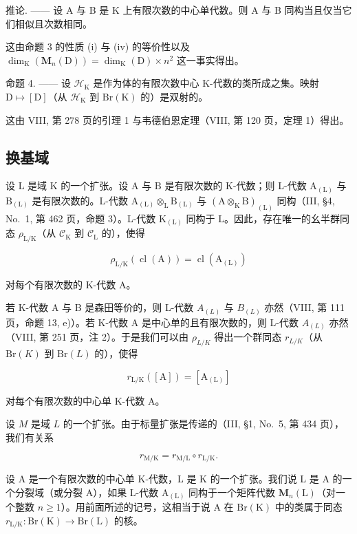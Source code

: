 推论. —— 设 A 与 B 是 K 上有限次数的中心单代数。则 A 与 B 同构当且仅当它们相似且次数相同。

这由命题 3 的性质 (i) 与 (iv) 的等价性以及 \(\dim_{\mathrm{K}}(\mathbf{M}_n(\mathrm{D})) = \dim_{\mathrm{K}}(\mathrm{D}) \times n^2\) 这一事实得出。

命题 4. —— 设 \(\mathcal{H}_{\mathrm{K}}\) 是作为体的有限次数中心 K-代数的类所成之集。映射 \(\mathrm{D} \mapsto [\mathrm{D}]\)（从 \(\mathcal{H}_{\mathrm{K}}\) 到 \(\mathrm{Br}(\mathrm{K})\) 的）是双射的。

这由 VIII, 第 278 页的引理 1 与韦德伯恩定理（VIII, 第 120 页，定理 1）得出。

\subsection{换基域}

设 \(\mathrm{L}\) 是域 \(\mathrm{K}\) 的一个扩张。设 \(\mathrm{A}\) 与 \(\mathrm{B}\) 是有限次数的 K-代数；则 L-代数 \(\mathrm{A}_{(\mathrm{L})}\) 与 \(\mathrm{B}_{(\mathrm{L})}\) 是有限次数的。L-代数 \(\mathrm{A}_{(\mathrm{L})} \otimes_{\mathrm{L}} \mathrm{B}_{(\mathrm{L})}\) 与 \((\mathrm{A} \otimes_{\mathrm{K}} \mathrm{B})_{(\mathrm{L})}\) 同构（III, §4, No.~1, 第 462 页，命题 3）。L-代数 \(\mathrm{K}_{(\mathrm{L})}\) 同构于 \(\mathrm{L}\)。因此，存在唯一的幺半群同态 \(\rho_{\mathrm{L/K}}\)（从 \(\mathcal{C}_{\mathrm{K}}\) 到 \(\mathcal{C}_{\mathrm{L}}\) 的），使得

\[
\rho_ {\mathrm{L/K}} (\operatorname{cl} (\mathrm{A})) = \operatorname{cl} (\mathrm{A} _ {(\mathrm{L})})\tag{3}
\]

对每个有限次数的 K-代数 A。

若 K-代数 A 与 B 是森田等价的，则 L-代数 \(A_{(L)}\) 与 \(B_{(L)}\) 亦然（VIII, 第 111 页，命题 13, e)）。若 K-代数 A 是中心单的且有限次数的，则 L-代数 \(A_{(L)}\) 亦然（VIII, 第 251 页，注 2）。于是我们可以由 \(\rho_{L/K}\) 得出一个群同态 \(r_{L/K}\)（从 \(\mathrm{Br}(K)\) 到 \(\mathrm{Br}(L)\) 的），使得

\[
r _ {\mathrm{L/K}} ([ \mathrm{A} ]) = [ \mathrm{A} _ {(\mathrm{L})} ]\tag{4}
\]

对每个有限次数的中心单 K-代数 A。

设 \(M\) 是域 \(L\) 的一个扩张。由于标量扩张是传递的（III, §1, No.~5, 第 434 页），我们有关系

\[
r _ {\mathrm{M/K}} = r _ {\mathrm{M/L}} \circ r _ {\mathrm{L/K}}.\tag{5}
\]

设 A 是一个有限次数的中心单 K-代数，L 是 K 的一个扩张。我们说 L 是 A 的一个分裂域（或分裂 A），如果 L-代数 \(\mathrm{A}_{(\mathrm{L})}\) 同构于一个矩阵代数 \(\mathbf{M}_{n}(\mathrm{L})\)（对一个整数 \(n \geqslant 1\)）。用前面所述的记号，这相当于说 A 在 \(\mathrm{Br}(\mathrm{K})\) 中的类属于同态 \(r_{\mathrm{L/K}} : \mathrm{Br}(\mathrm{K}) \to \mathrm{Br}(\mathrm{L})\) 的核。

